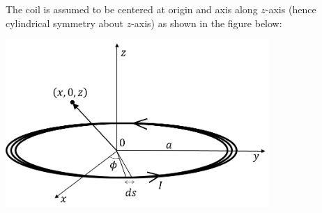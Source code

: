\documentclass[12pt]{article}
\begin{document}
The coil is assumed to be centered at origin and axis along $z$-axis (hence cylindrical symmetry about $z$-axis) as shown in the figure below:

\begin{center}
\includegraphics[width=100mm]{coil.png}
\end{center}
\end{document}
